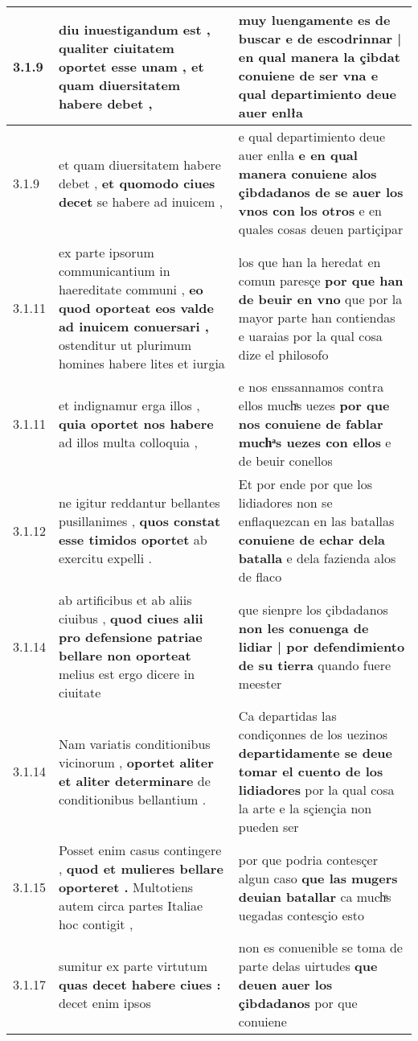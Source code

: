 \begin{tabular}{|p{1cm}|p{6.5cm}|p{6.5cm}|}
3.1.9 & diu inuestigandum est , \textbf{ qualiter ciuitatem oportet esse unam , } et quam diuersitatem habere debet , & muy luengamente es de buscar \textbf{ e de escodrinnar | en qual manera la çibdat conuiene de ser vna } e qual departimiento deue auer enlła \\\hline
3.1.9 & et quam diuersitatem habere debet , \textbf{ et quomodo ciues decet } se habere ad inuicem , & e qual departimiento deue auer enlła \textbf{ e en qual manera conuiene alos çibdadanos de se auer los vnos con los otros } e en quales cosas deuen partiçipar \\\hline
3.1.11 & ex parte ipsorum communicantium in haereditate communi , \textbf{ eo quod oporteat eos valde ad inuicem conuersari , } ostenditur ut plurimum homines habere lites et iurgia & los que han la heredat en comun paresçe \textbf{ por que han de beuir en vno } que por la mayor parte han contiendas e uaraias por la qual cosa dize el philosofo \\\hline
3.1.11 & et indignamur erga illos , \textbf{ quia oportet nos habere } ad illos multa colloquia , & e nos enssannamos contra ellos muchͣs uezes \textbf{ por que nos conuiene de fablar muchͣs uezes con ellos } e de beuir conellos \\\hline
3.1.12 & ne igitur reddantur bellantes pusillanimes , \textbf{ quos constat esse timidos oportet } ab exercitu expelli . & Et por ende por que los lidiadores non se enflaquezcan en las batallas \textbf{ conuiene de echar dela batalla } e dela fazienda alos de flaco \\\hline
3.1.14 & ab artificibus et ab aliis ciuibus , \textbf{ quod ciues alii pro defensione patriae bellare non oporteat } melius est ergo dicere in ciuitate & que sienpre los çibdadanos \textbf{ non les conuenga de lidiar | por defendimiento de su tierra } quando fuere meester \\\hline
3.1.14 & Nam variatis conditionibus vicinorum , \textbf{ oportet aliter et aliter determinare } de conditionibus bellantium . & Ca departidas las condiçonnes de los uezinos \textbf{ departidamente se deue tomar el cuento de los lidiadores } por la qual cosa la arte e la sçiençia non pueden ser \\\hline
3.1.15 & Posset enim casus contingere , \textbf{ quod et mulieres bellare oporteret . } Multotiens autem circa partes Italiae hoc contigit , & por que podria contesçer algun caso \textbf{ que las mugers deuian batallar } ca muchͣs uegadas contesçio esto \\\hline
3.1.17 & sumitur ex parte virtutum \textbf{ quas decet habere ciues : } decet enim ipsos & non es conuenible se toma de parte delas uirtudes \textbf{ que deuen auer los çibdadanos } por que conuiene \\\hline

\end{tabular}
